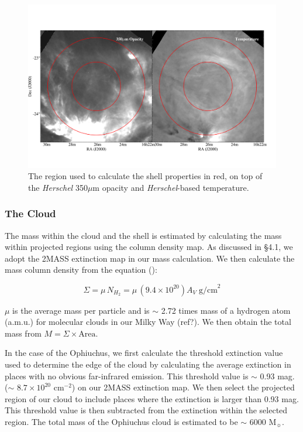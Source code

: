 \documentclass[11pt,a4paper]{emulateapj}
\begin{document}
\begin{figure}[ht]
\centering
\includegraphics[scale=0.3]{fig/shell_herschel_circles.png}
\caption{The region used to calculate the shell properties in red, on top of the {\it Herschel} 350$\mu$m opacity and {\it Herschel}-based temperature.
}
\end{figure}

\subsubsection{The Cloud}
The mass within the cloud and the shell is estimated by calculating the mass within projected regions using the column density map. As discussed in \S4.1, we adopt the 2MASS extinction map in our mass calculation. We then calculate the mass column density from the equation (\citet{Arce_2001}):

\begin{equation}
\Sigma = \mu\,N_{H_2} = \mu\,(9.4\times10^{20})A_V\;\text{g/cm}^2
\end{equation}

$\mu$ is the average mass per particle and is $\sim$ 2.72 times mass of a hydrogen atom (a.m.u.) for molecular clouds in our Milky Way (ref?). We then obtain the total mass from $M = \Sigma\times \text{Area}$.

In the case of the Ophiuchus, we first calculate the threshold extinction value used to determine the edge of the cloud by calculating the average extinction in places with no obvious far-infrared emission. This threshold value is $\sim$ 0.93 mag. ($\sim$ $8.7 \times 10^{20}$ cm$^{-2}$) on our 2MASS extinction map. We then select the projected region of our cloud to include places where the extinction is larger than 0.93 mag. This threshold value is then subtracted from the extinction within the selected region. The total mass of the Ophiuchus cloud is estimated to be $\sim$ 6000 M$_{\sun}$.
\end{document}
